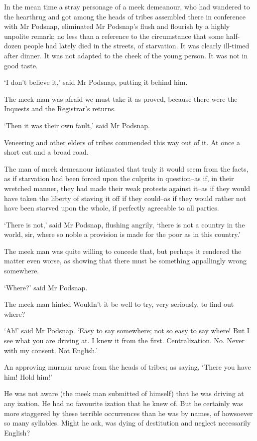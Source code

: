 In the mean time a stray personage of a meek demeanour, who had wandered
to the hearthrug and got among the heads of tribes assembled there in
conference with Mr Podsnap, eliminated Mr Podsnap’s flush and
flourish by a highly unpolite remark; no less than a reference to the
circumstance that some half-dozen people had lately died in the streets,
of starvation. It was clearly ill-timed after dinner. It was not adapted
to the cheek of the young person. It was not in good taste.

‘I don’t believe it,’ said Mr Podsnap, putting it behind him.

The meek man was afraid we must take it as proved, because there were
the Inquests and the Registrar’s returns.

‘Then it was their own fault,’ said Mr Podsnap.

Veneering and other elders of tribes commended this way out of it. At
once a short cut and a broad road.

The man of meek demeanour intimated that truly it would seem from
the facts, as if starvation had been forced upon the culprits in
question--as if, in their wretched manner, they had made their weak
protests against it--as if they would have taken the liberty of staving
it off if they could--as if they would rather not have been starved upon
the whole, if perfectly agreeable to all parties.

‘There is not,’ said Mr Podsnap, flushing angrily, ‘there is not a
country in the world, sir, where so noble a provision is made for the
poor as in this country.’

The meek man was quite willing to concede that, but perhaps it
rendered the matter even worse, as showing that there must be something
appallingly wrong somewhere.

‘Where?’ said Mr Podsnap.

The meek man hinted Wouldn’t it be well to try, very seriously, to find
out where?

‘Ah!’ said Mr Podsnap. ‘Easy to say somewhere; not so easy to say
where! But I see what you are driving at. I knew it from the first.
Centralization. No. Never with my consent. Not English.’

An approving murmur arose from the heads of tribes; as saying, ‘There
you have him! Hold him!’

He was not aware (the meek man submitted of himself) that he was driving
at any ization. He had no favourite ization that he knew of. But he
certainly was more staggered by these terrible occurrences than he was
by names, of howsoever so many syllables. Might he ask, was dying of
destitution and neglect necessarily English?

